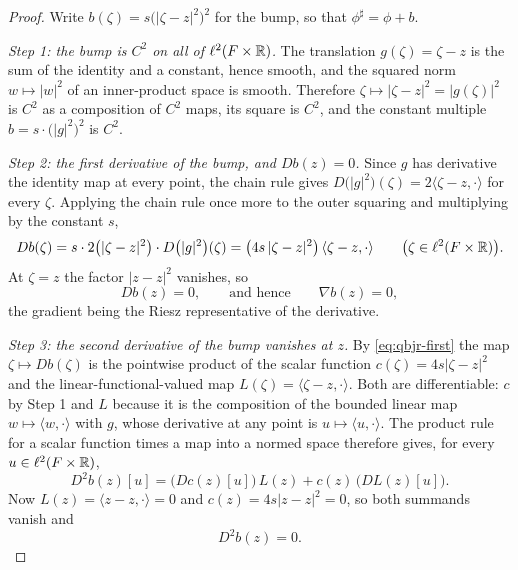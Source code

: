 \begin{proof}
Write $b(\zeta)=s\bigl(|\zeta-z|^2\bigr)^2$ for the bump, so that
$\phi^\sharp=\phi+b$.

\emph{Step 1: the bump is $C^2$ on all of $\ell^2(F\times\mathbb{R})$.}
The translation $g(\zeta)=\zeta-z$ is the sum of the identity and a constant,
hence smooth, and the squared norm $w\mapsto|w|^2$ of an inner-product space is
smooth. Therefore $\zeta\mapsto|\zeta-z|^2=|g(\zeta)|^2$ is $C^2$ as a
composition of $C^2$ maps, its square is $C^2$, and the constant multiple
$b=s\cdot\bigl(|g|^2\bigr)^2$ is $C^2$.

\emph{Step 2: the first derivative of the bump, and $Db(z)=0$.}
Since $g$ has derivative the identity map at every point, the chain rule gives
$D\bigl(|g|^2\bigr)(\zeta)=2\langle\zeta-z,\cdot\rangle$ for every $\zeta$.
Applying the chain rule once more to the outer squaring and multiplying by the
constant $s$,
\begin{equation}\label{eq:qbjr-first}
  Db(\zeta)=s\cdot 2\bigl(|\zeta-z|^2\bigr)\cdot
     D\bigl(|g|^2\bigr)(\zeta)
   =\bigl(4s\,|\zeta-z|^2\bigr)\,\langle\zeta-z,\cdot\rangle
  \qquad\bigl(\zeta\in\ell^2(F\times\mathbb{R})\bigr).
\end{equation}
At $\zeta=z$ the factor $|z-z|^2$ vanishes, so
\begin{equation}\label{eq:qbjr-grad}
  Db(z)=0,\qquad\text{and hence}\qquad\nabla b(z)=0 ,
\end{equation}
the gradient being the Riesz representative of the derivative.

\emph{Step 3: the second derivative of the bump vanishes at $z$.}
By \eqref{eq:qbjr-first} the map $\zeta\mapsto Db(\zeta)$ is the pointwise
product of the scalar function $c(\zeta)=4s|\zeta-z|^2$ and the
linear-functional-valued map $L(\zeta)=\langle\zeta-z,\cdot\rangle$. Both are
differentiable: $c$ by Step 1 and $L$ because it is the composition of the
bounded linear map $w\mapsto\langle w,\cdot\rangle$ with $g$, whose derivative
at any point is $u\mapsto\langle u,\cdot\rangle$. The product rule for a scalar
function times a map into a normed space therefore gives, for every
$u\in\ell^2(F\times\mathbb{R})$,
\[
  D^2b(z)[u]=\bigl(Dc(z)[u]\bigr)\,L(z)+c(z)\,\bigl(DL(z)[u]\bigr).
\]
Now $L(z)=\langle z-z,\cdot\rangle=0$ and $c(z)=4s|z-z|^2=0$, so both summands
vanish and
\begin{equation}\label{eq:qbjr-fourth}
  D^2b(z)=0 .
\end{equation}


\end{proof}
